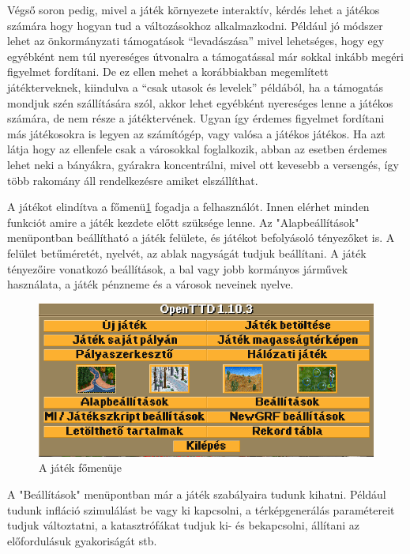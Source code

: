 Végső soron pedig, mivel a játék környezete interaktív, kérdés lehet a játékos számára hogy hogyan tud a változásokhoz alkalmazkodni. Például jó módszer lehet az önkormányzati támogatások “levadászása” mivel lehetséges, hogy egy egyébként nem túl nyereséges útvonalra a támogatással már sokkal inkább megéri figyelmet fordítani. De ez ellen mehet a korábbiakban megemlített játékterveknek, kiindulva a “csak utasok és levelek” példából, ha a támogatás mondjuk szén szállítására szól, akkor lehet egyébként nyereséges lenne a játékos számára, de nem része a játéktervének. Ugyan így érdemes figyelmet fordítani más játékosokra is legyen az számítógép, vagy valósa a játékos játékos. Ha azt látja hogy az ellenfele csak a városokkal foglalkozik, abban az esetben érdemes lehet neki a bányákra, gyárakra koncentrálni, mivel ott kevesebb a versengés, így több rakomány áll rendelkezésre amiket elszállíthat.


A játékot elindítva a főmenü\ref{fig:menu} fogadja a felhasználót. Innen elérhet minden funkciót amire a játék kezdete előtt szüksége lenne. Az "Alapbeállítások" menüpontban beállítható a játék felülete, és játékot befolyásoló tényezőket is. A felület betűméretét, nyelvét, az ablak nagyságát tudjuk beállítani. A játék tényezőire vonatkozó beállítások, a bal vagy jobb kormányos járművek használata, a játék pénzneme és a városok neveinek nyelve.

\begin{figure}
	\centering
	\includegraphics[scale=0.8]{images/menu.png}
	\caption{A játék főmenüje}
	\label{fig:menu}
\end{figure}

A "Beállítások" menüpontban már a játék szabályaira tudunk kihatni. Például tudunk infláció szimulálást be vagy ki kapcsolni, a térképgenerálás paramétereit tudjuk változtatni, a katasztrófákat tudjuk ki- és bekapcsolni, állítani az előfordulásuk gyakoriságát stb.

